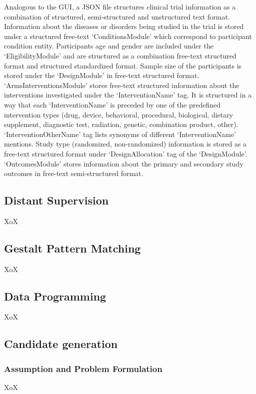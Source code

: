 \documentclass[10.7pt,]{article}
\begin{document}
Analogous to the GUI, a JSON file structures clinical trial information as a combination of structured, semi-structured and unstructured text format.
Information about the diseases or disorders being studied in the trial is stored under a structured free-text `ConditionsModule' which correspond to participant condition entity.
Participants age and gender are included under the `EligibilityModule' and are structured as a combination free-text structured format and structured standardized format. 
Sample size of the participants is stored under the `DesignModule' in free-text structured format.
`ArmsInterventionsModule' stores free-text structured information about the interventions investigated under the `InterventionName' tag. 
It is structured in a way that each `InterventionName' is preceded by one of the predefined intervention types (drug, device, behavioral, procedural, biological, dietary supplement, diagnostic test, radiation, genetic, combination product, other).
`InterventionOtherName' tag lists synonyms of different `InterventionName' mentions.
Study type (randomized, non-randomized) information is stored as a free-text structured format under `DesignAllocation' tag of the `DesignModule'.
`OutcomesModule' stores information about the primary and secondary study outcomes in free-text semi-structured format. 
%
%
%
\subsection{Distant Supervision}
%
XoX
%
%
%
\subsection{Gestalt Pattern Matching}
%
XoX
%
%
%
\subsection{Data Programming}
%
XoX
%
%
%
\subsection{Candidate generation}\label{candgen}
%
\subsubsection{Assumption and Problem Formulation}
%
XoX
%
%
\end{document}

